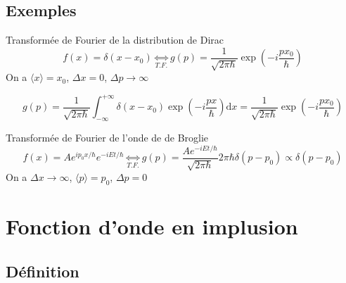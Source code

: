 \subsection{Exemples} %
\label{sub:Exemples}

\begin{Prop}{Transformée de Fourier de la distribution de Dirac}{}
\[
  f(x) = \delta(x- x_0) \underset{T.F.}{\iff} g(p)  = \frac{1}{\sqrt{2 \pi \hbar}}  \exp \left( -i \frac{p x_0}{\hbar}  \right)
\]
On a $\langle x \rangle = x_0$, $\Delta x = 0$, $\Delta p \to \infty$
\end{Prop}

\begin{myproof}{}{}
\[
  g(p) = \frac{1}{\sqrt{2 \pi \hbar}}  \displaystyle\int_{- \infty}^{+ \infty} \delta(x-x_0) \exp \left( -i \frac{px}{\hbar}  \right) \mathrm{d} x = \frac{1}{\sqrt{2 \pi \hbar}}  \exp \left( -i \frac{p x_0}{\hbar}  \right)
\]
\end{myproof}

\begin{Prop}{Transformée de Fourier de l'onde de de Broglie}{}
\[
  f(x) = A e^{ip_0 x / \hbar} e^{ - iEt/\hbar} \underset{T.F.}{\iff} g(p) = \frac{A e^{-iEt/\hbar}}{\sqrt{2 \pi \hbar}} 2 \pi \hbar \delta(p-p_0) \propto \delta(p-p_0)
\]
On a $\Delta x \to \infty$, $\langle p \rangle = p_0$, $\Delta p =0$
\end{Prop}

\newpage
\section{Fonction d'onde en implusion} %
\label{sec:Fonction d'onde en implusion}

\subsection{Définition} %


